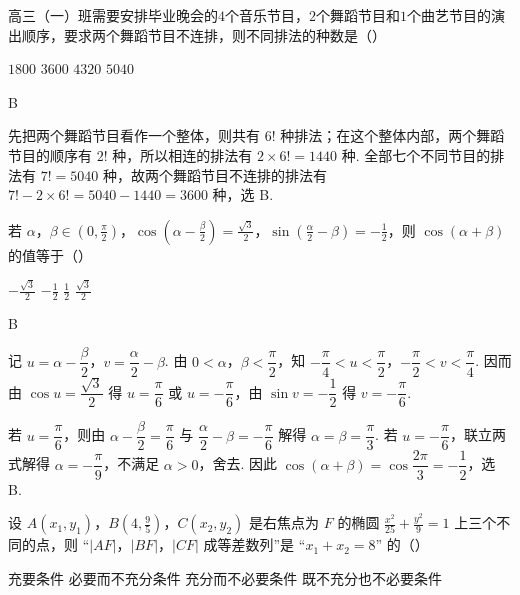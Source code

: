 \begin{problem}
高三（一）班需要安排毕业晚会的\(4\)个音乐节目，\(2\)个舞蹈节目和\(1\)个曲艺节目的演出顺序，要求两个舞蹈节目不连排，则不同排法的种数是（\quad）

\choices
    {\(1800\)}
    {\(3600\)}
    {\(4320\)}
    {\(5040\)}
\end{problem}

\begin{answer}
B
\end{answer}

\begin{solution}
先把两个舞蹈节目看作一个整体，则共有 \(6!\) 种排法；在这个整体内部，两个舞蹈节目的顺序有 \(2!\) 种，所以相连的排法有 \(2\times6!=1440\) 种. 全部七个不同节目的排法有 \(7!=5040\) 种，故两个舞蹈节目不连排的排法有
\(7!-2\times6!=5040-1440=3600\) 种，选 B.
\end{solution}

\begin{problem}
若 \(\alpha\)，\(\beta \in \left(0, \frac{\pi}{2}\right)\)，\(\cos \left(\alpha - \frac{\beta}{2}\right) = \frac{\sqrt{3}}{2}\)，\(\sin \left(\frac{\alpha}{2} - \beta\right) = -\frac{1}{2}\)，则 \(\cos (\alpha + \beta)\) 的值等于（\quad）

\choices
    {\(-\frac{\sqrt{3}}{2}\)}
    {\(-\frac{1}{2}\)}
    {\( \frac{1}{2} \)}
    {\(\frac{\sqrt{3}}{2}\)}
\end{problem}

\begin{answer}
B
\end{answer}

\begin{solution}
记 \(u=\alpha-\dfrac\beta2\)，\(v=\dfrac\alpha2-\beta\). 由 \(0<\alpha\)，\(\beta<\dfrac\pi2\)，知 \(-\dfrac\pi4<u<\dfrac\pi2\)，\(-\dfrac\pi2<v<\dfrac\pi4\). 因而由
\(\cos u=\dfrac{\sqrt3}{2}\) 得 \(u=\dfrac\pi6\) 或 \(u=-\dfrac\pi6\)，由 \(\sin v=-\dfrac12\) 得 \(v=-\dfrac\pi6\).

若 \(u=\dfrac\pi6\)，则由 \(\alpha-\dfrac\beta2=\dfrac\pi6\) 与 \(\dfrac\alpha2-\beta=-\dfrac\pi6\) 解得 \(\alpha=\beta=\dfrac\pi3\). 若 \(u=-\dfrac\pi6\)，联立两式解得 \(\alpha=-\dfrac\pi9\)，不满足 \(\alpha>0\)，舍去. 因此 \(\cos(\alpha+\beta)=\cos\dfrac{2\pi}{3}=-\dfrac12\)，选 B.
\end{solution}

\begin{problem}
设 \(A(x_{1},y_{1})\)，\(B\left(4, \frac{9}{5}\right)\)，\(C(x_{2},y_{2})\) 是右焦点为 \(F\) 的椭圆 \(\frac{x^2}{25} + \frac{y^2}{9} = 1\) 上三个不同的点，则 “\(|AF|\)，\(|BF|\)，\(|CF|\) 成等差数列”是 “\(x_{1} + x_{2} = 8\)” 的（\quad）

\choices
    {充要条件}
    {必要而不充分条件}
    {充分而不必要条件}
    {既不充分也不必要条件}
\end{problem}

